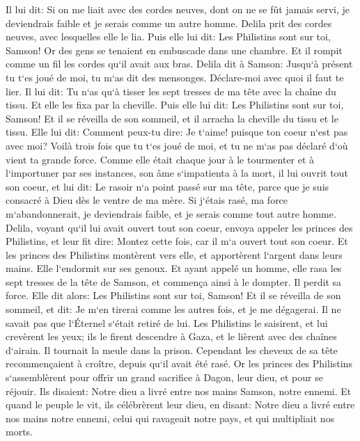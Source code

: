 \verse Il lui dit: Si on me liait avec des cordes neuves, dont on ne se fût jamais servi, je deviendrais faible et je serais comme un autre homme. 
\verse Delila prit des cordes neuves, avec lesquelles elle le lia. Puis elle lui dit: Les Philistins sont sur toi, Samson! Or des gens se tenaient en embuscade dans une chambre. Et il rompit comme un fil les cordes qu`il avait aux bras. 
\verse Delila dit à Samson: Jusqu`à présent tu t`es joué de moi, tu m`as dit des mensonges. Déclare-moi avec quoi il faut te lier. Il lui dit: Tu n`as qu`à tisser les sept tresses de ma tête avec la chaîne du tissu. 
\verse Et elle les fixa par la cheville. Puis elle lui dit: Les Philistins sont sur toi, Samson! Et il se réveilla de son sommeil, et il arracha la cheville du tissu et le tissu. 
\verse Elle lui dit: Comment peux-tu dire: Je t`aime! puisque ton coeur n`est pas avec moi? Voilà trois fois que tu t`es joué de moi, et tu ne m`as pas déclaré d`où vient ta grande force. 
\verse Comme elle était chaque jour à le tourmenter et à l`importuner par ses instances, son âme s`impatienta à la mort, 
\verse il lui ouvrit tout son coeur, et lui dit: Le rasoir n`a point passé sur ma tête, parce que je suis consacré à Dieu dès le ventre de ma mère. Si j`étais rasé, ma force m`abandonnerait, je deviendrais faible, et je serais comme tout autre homme. 
\verse Delila, voyant qu`il lui avait ouvert tout son coeur, envoya appeler les princes des Philistins, et leur fit dire: Montez cette fois, car il m`a ouvert tout son coeur. Et les princes des Philistins montèrent vers elle, et apportèrent l`argent dans leurs mains. 
\verse Elle l`endormit sur ses genoux. Et ayant appelé un homme, elle rasa les sept tresses de la tête de Samson, et commença ainsi à le dompter. Il perdit sa force. 
\verse Elle dit alors: Les Philistins sont sur toi, Samson! Et il se réveilla de son sommeil, et dit: Je m`en tirerai comme les autres fois, et je me dégagerai. Il ne savait pas que l`Éternel s`était retiré de lui. 
\verse Les Philistins le saisirent, et lui crevèrent les yeux; ils le firent descendre à Gaza, et le lièrent avec des chaînes d`airain. Il tournait la meule dans la prison. 
\verse Cependant les cheveux de sa tête recommençaient à croître, depuis qu`il avait été rasé. 
\verse Or les princes des Philistins s`assemblèrent pour offrir un grand sacrifice à Dagon, leur dieu, et pour se réjouir. Ils disaient: Notre dieu a livré entre nos mains Samson, notre ennemi. 
\verse Et quand le peuple le vit, ils célébrèrent leur dieu, en disant: Notre dieu a livré entre nos mains notre ennemi, celui qui ravageait notre pays, et qui multipliait nos morts. 
